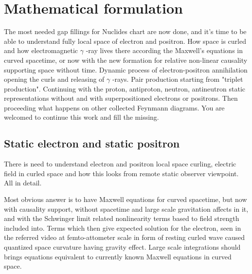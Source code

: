 %
%
%

\chapter{Mathematical formulation}

The most needed gap fillings for Nuclides chart\allowbreak\cite{Nuclides} are
now done, and it's time to be able to understand fully local space of electron
and positron. How space is curled and how electromagnetic $\gamma$ -ray lives
there according the Maxwell's equations in curved spacetime\allowbreak\cite{
MaxwellsEquations}, or now with the new formation for relative non-linear
causality supporting space without time. Dynamic process of electron-positron
annihilation\allowbreak\cite{Annihilation} opening the curls and releasing of
$\gamma$ -rays. Pair production\allowbreak\cite{PairProduction} starting from
"triplet production". Continuing with the proton, antiproton, neutron,
antineutron static representations without and with superpositioned electrons
or pos\-i\-trons. Then proceeding what happens on other collected Feynmann
diagrams\allowbreak\cite{FeynmannDiagram}. You are welcomed to continue this
work and fill the missing.

\section{Static electron and static positron}
\label{electron_positron}

There is need to understand electron and positron local space curling,
electric field in curled space and how this looks from remote static
observer viewpoint\allowbreak\cite{ElectronVideo}. All in detail.

Most obvious answer is to have Maxwell equations for curved spacetime, but
now with causality support, without spacetime and large scale gravitation
affects in it, and with the Schwinger limit\allowbreak\cite{SchwingerLimit}
related nonlinearity terms based to field strength included into. Terms which
then give expected solution for the electron, seen in the referred
video\allowbreak\cite{ElectronVideo} at femto-attometer scale in form of
resting curled wave caused quantized space curvature having gravity effect.
Large scale integrations should brings equations equivalent to currently
known Maxwell equations in curved space.

